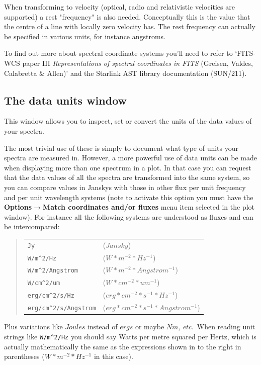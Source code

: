 \documentclass[twoside,11pt]{article}
\newcommand{\latexhtml}[2]{#1}
\newcommand{\xref}[3]{#1}
\renewcommand{\_}{\texttt{\symbol{95}}}
\newcommand{\submenuitem}[2]{\latexhtml{\textbf{#1$\rightarrow$#2}}{\textbf{#1->#2}}}
\newcommand{\hitext}[1]{\texttt{#1}}
\newcommand{\etc}{\textit{etc.}}
\begin{document}
When transforming to velocity (optical, radio and relativistic velocities are
supported) a rest "frequency" is also needed.  Conceptually this is the value
that the centre of a line with locally zero velocity has. The rest frequency
can actually be specified in various units, for instance angstroms.

To find out more about spectral coordinate systems you'll need to refer to
`FITS-WCS paper III
\textit{Representations of spectral coordinates in FITS}
(Greisen, Valdes, Calabretta \& Allen)' and the Starlink AST library
documentation (\xref{SUN/211}{sun211}{ss:specframes}).


\newpage
\subsection{The data units window}

This window allows you to inspect, set or convert the units of the data values
of your spectra.

The most trivial use of these is simply to document what type of units your
spectra are measured in. However, a more powerful use of data units can be
made when displaying more than one spectrum in a plot.  In that case you can
request that the data values of all the spectra are transformed into the same
system, so you can compare values in Janskys with those in other flux per unit
frequency and per unit wavelength systems (note to activate this option you
must have the
\submenuitem{Options}{Match coordinates and/or fluxes} menu item selected
in the plot window). For instance all the following systems are understood as
fluxes and can be intercompared:
\begin{quote}
\begin{tabular}{ll}
\verb+Jy+                  & ($Jansky$)                                \\
\verb+W/m^2/Hz+            & ($W*m^{-2}*Hz^{-1}$)                      \\
\verb+W/m^2/Angstrom+      & ($W*m^{-2}*Angstrom^{-1}$)                \\
\verb+W/cm^2/um+           & ($W*cm^{-2}*um^{-1}$)                     \\
\verb+erg/cm^2/s/Hz+       & ($erg*cm^{-2}*s^{-1}*Hz^{-1}$)            \\
\verb+erg/cm^2/s/Angstrom+ & ($erg*cm^{-2}*s^{-1}*Angstrom^{-1}$)
\end{tabular}
\end{quote}
Plus variations like $Joules$ instead of $ergs$ or maybe $N m$, \etc\
When reading unit strings like \verb+W/m^2/Hz+ you should say Watts per metre
squared per Hertz, which is actually mathematically the same as the
expressions shown in to the right in parentheses
(\hitext{$W*m^{-2}*Hz^{-1}$} in this case).
\end{document}
